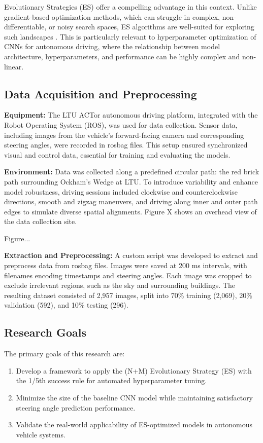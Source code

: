 \documentclass[conference]{IEEEtran}
\begin{document}
Evolutionary Strategies (ES) offer a compelling advantage in this context. Unlike gradient-based optimization methods, which can struggle in complex, non-differentiable, or noisy search spaces, ES algorithms are well-suited for exploring such landscapes \cite{b1}. This is particularly relevant to hyperparameter optimization of CNNs for autonomous driving, where the relationship between model architecture, hyperparameters, and performance can be highly complex and non-linear.

\subsection{Data Acquisition and Preprocessing}

\textbf{Equipment:} The LTU ACTor autonomous driving platform, integrated with the Robot Operating System (ROS), was used for data collection. Sensor data, including images from the vehicle's forward-facing camera and corresponding steering angles, were recorded in rosbag files. This setup ensured synchronized visual and control data, essential for training and evaluating the models.

\textbf{Environment:} Data was collected along a predefined circular path: the red brick path surrounding Ockham's Wedge at LTU. To introduce variability and enhance model robustness, driving sessions included clockwise and counterclockwise directions, smooth and zigzag maneuvers, and driving along inner and outer path edges to simulate diverse spatial alignments.  Figure X shows an overhead view of the data collection site.

Figure...

\textbf{Extraction and Preprocessing:} A custom script was developed to extract and preprocess data from rosbag files. Images were saved at 200 ms intervals, with filenames encoding timestamps and steering angles. Each image was cropped to exclude irrelevant regions, such as the sky and surrounding buildings. The resulting dataset consisted of 2,957 images, split into 70\% training (2,069), 20\% validation (592), and 10\% testing (296).

\subsection{Research Goals}

The primary goals of this research are:
\begin{enumerate}
    \item Develop a framework to apply the (N+M) Evolutionary Strategy (ES) with the 1/5th success rule for automated hyperparameter tuning.
    \item Minimize the size of the baseline CNN model while maintaining satisfactory steering angle prediction performance.
    \item Validate the real-world applicability of ES-optimized models in autonomous vehicle systems.
\end{enumerate}
\end{document}
